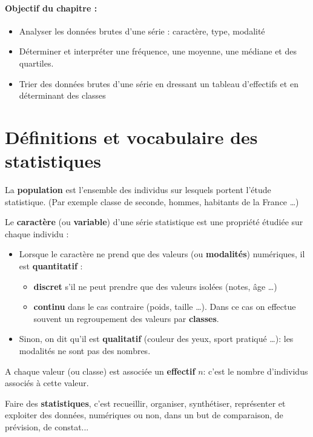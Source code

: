\paragraph*{Objectif du chapitre :}
\begin{itemize}
\item  Analyser les données brutes d'une série : caractère, type, modalité
\item  Déterminer et interpréter une fréquence, une moyenne, une médiane et  des quartiles.
\item  Trier des données brutes d'une série en dressant un tableau d'effectifs et en déterminant des classes
\end{itemize}

\section{Définitions et vocabulaire des statistiques}

La \textbf{population} est l'ensemble des individus sur lesquels portent l'étude statistique. \textsf{(Par exemple classe de seconde, hommes, habitants de la France \dots)}

\bigskip
Le \textbf{caractère} (ou \textbf{variable}) d'une série statistique est une propriété étudiée sur chaque individu :
\begin{itemize}
   \item  Lorsque le caractère ne prend que des valeurs (ou \textbf{modalités}) numériques, il est \textbf{quantitatif} :
   \begin{itemize}
       \item \textbf{discret} s'il ne peut prendre que des valeurs isolées \textsf{(notes, âge \dots )}
       \item \textbf{continu} dans le cas contraire \textsf{(poids, taille \dots )}. Dans ce cas on effectue souvent un regroupement des valeurs par \textbf{classes}.
    \end{itemize}
  \item  Sinon, on dit qu'il est \textbf{qualitatif} \textsf{(couleur des yeux, sport pratiqué \dots )}: les modalités ne sont pas des nombres.
\end{itemize}

\bigskip
\noindent A chaque valeur (ou classe) est associée un \textbf{effectif} $n$: c'est le nombre  d'individus associés à cette valeur.

\bigskip
Faire des \textbf{statistiques}, c'est recueillir, organiser, synthétiser, représenter et exploiter des données, numériques ou non, dans un but de comparaison, de prévision, de constat...

